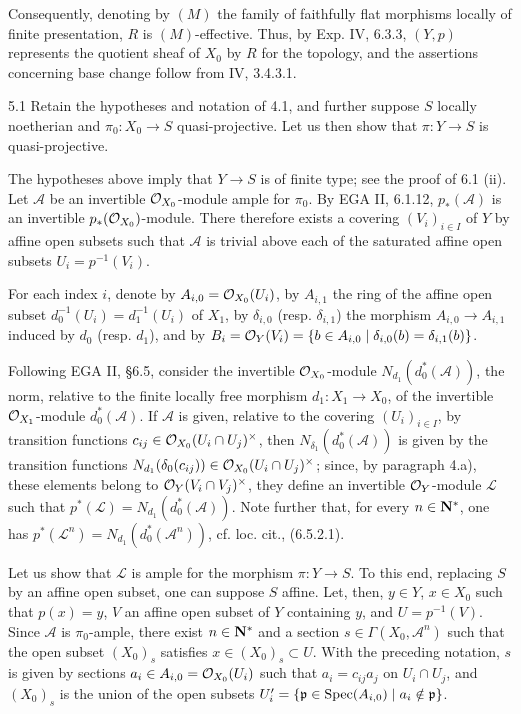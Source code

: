 Consequently, denoting by $(M)$ the family of faithfully flat morphisms locally of finite presentation, $R$ is $(M)$-effective. Thus, by Exp. IV, 6.3.3, $(Y,p)$ represents the quotient sheaf of $X_0$ by $R$ for the \fppf topology, and the assertions concerning base change follow from IV, 3.4.3.1.
\begin{remark}{5.1}\label{V.5.1}
Retain the hypotheses and notation of 4.1, and further suppose $S$ locally noetherian and $\pi_0:X_0\to S$ quasi-projective. Let us then show that $\pi:Y\to S$ is quasi-projective.

The hypotheses above imply that $Y\to S$ is of finite type; see the proof of 6.1 (ii). Let $\mathcal A$ be an invertible $\mathcal{O}_{X_0}$-module ample for $\pi_0$. By EGA II, 6.1.12, $p_*(\mathcal A)$ is an invertible $p_*(\mathcal{O}_{X_0})$-module. There therefore exists a covering $(V_i)_{i\in I}$ of $Y$ by affine open subsets such that $\mathcal A$ is trivial above each of the saturated affine open subsets $U_i=p^{-1}(V_i)$.

For each index $i$, denote by $A_{i,0}=\mathcal{O}_{X_0}(U_i)$, by $A_{i,1}$ the ring of the affine open subset $d_0^{-1}(U_i)=d_1^{-1}(U_i)$ of $X_1$, by $\delta_{i,0}$ (resp. $\delta_{i,1}$) the morphism $A_{i,0}\to A_{i,1}$ induced by $d_0$ (resp. $d_1$), and by $B_i=\mathcal{O}_Y(V_i)=\{b\in A_{i,0}\mid\delta_{i,0}(b)=\delta_{i,1}(b)\}$.

Following EGA II, §6.5, consider the invertible $\mathcal{O}_{X_0}$-module $N_{d_1}(d_0^*(\mathcal A))$, the norm, relative to the finite locally free morphism $d_1:X_1\to X_0$, of the invertible $\mathcal{O}_{X_1}$-module $d_0^*(\mathcal A)$. If $\mathcal A$ is given, relative to the covering $(U_i)_{i\in I}$, by transition functions $c_{ij}\in\mathcal{O}_{X_0}(U_i\cap U_j)^\times$, then $N_{\delta_1}(d_0^*(\mathcal A))$ is given by the transition functions $N_{d_1}(\delta_0(c_{ij}))\in\mathcal{O}_{X_0}(U_i\cap U_j)^\times$; since, by paragraph 4.a), these elements belong to $\mathcal{O}_Y(V_i\cap V_j)^\times$, they define an invertible $\mathcal{O}_Y$-module $\mathcal L$ such that $p^*(\mathcal L)=N_{d_1}(d_0^*(\mathcal A))$. Note further that, for every $n\in\mathbf{N}^*$, one has $p^*(\mathcal L^n)=N_{d_1}(d_0^*(\mathcal A^n))$, cf. loc. cit., (6.5.2.1).

Let us show that $\mathcal L$ is ample for the morphism $\pi:Y\to S$. To this end, replacing $S$ by an affine open subset, one can suppose $S$ affine. Let, then, $y\in Y$, $x\in X_0$ such that $p(x)=y$, $V$ an affine open subset of $Y$ containing $y$, and $U=p^{-1}(V)$. Since $\mathcal A$ is $\pi_0$-ample, there exist $n\in\mathbf{N}^*$ and a section $s\in\Gamma(X_0,\mathcal A^n)$ such that the open subset $(X_0)_s$ satisfies $x\in(X_0)_s\subset U$. With the preceding notation, $s$ is given by sections $a_i\in A_{i,0}=\mathcal{O}_{X_0}(U_i)$ such that $a_i=c_{ij}a_j$ on $U_i\cap U_j$, and $(X_0)_s$ is the union of the open subsets $U'_i=\{\mathfrak p\in\operatorname{Spec}(A_{i,0})\mid a_i\notin\mathfrak p\}$.


\end{remark}
